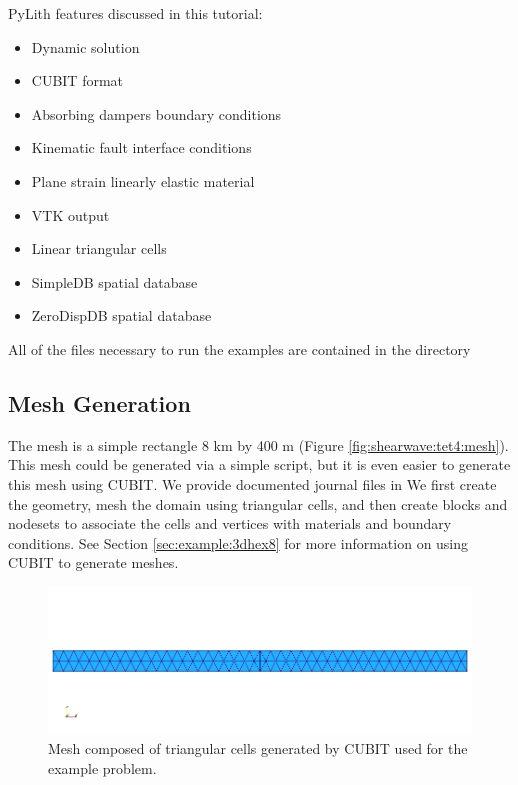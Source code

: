 PyLith features discussed in this tutorial:
\begin{itemize}
\item Dynamic solution
\item CUBIT format
\item Absorbing dampers boundary conditions
\item Kinematic fault interface conditions
\item Plane strain linearly elastic material
\item VTK output
\item Linear triangular cells
\item SimpleDB spatial database
\item ZeroDispDB spatial database
\end{itemize}
All of the files necessary to run the examples are contained in the
directory 


\subsection{Mesh Generation}

The mesh is a simple rectangle 8 km by 400 m (Figure
\vref{fig:shearwave:tet4:mesh}).  This mesh could be generated via a
simple script, but it is even easier to generate this mesh using
CUBIT. We provide documented journal files in
 We first create the geometry,
mesh the domain using triangular cells, and then create blocks and
nodesets to associate the cells and vertices with materials and
boundary conditions. See Section \vref{sec:example:3dhex8} for more
information on using CUBIT to generate meshes.

\begin{figure}
  \includegraphics[scale=0.5]{examples/figs/shearwave_tri3mesh}
  \caption{Mesh composed of triangular cells generated by CUBIT used for the
    example problem.}
\label{fig:shearwave:tri3:mesh}
\end{figure}



